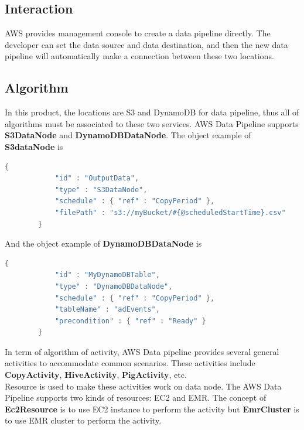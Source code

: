 	\subsection{Interaction}
	AWS provides management console to create a data pipeline directly. The developer can set the data source and data destination, and then the new data pipeline will automatically make  a connection between these two locations.  
    
	\subsection{Algorithm}
	In this product, the locations are S3 and DynamoDB for data pipeline, thus all of algorithms must be associated to these two services. AWS Data Pipeline supports \textbf{S3DataNode} and \textbf{DynamoDBDataNode}. The  object example of \textbf{S3dataNode} is

	\begin{lstlisting}[language=Java, caption=S3 Data Node example\cite{z6}]
        {
            "id" : "OutputData",
            "type" : "S3DataNode",
            "schedule" : { "ref" : "CopyPeriod" },
            "filePath" : "s3://myBucket/#{@scheduledStartTime}.csv"
        }
	\end{lstlisting}
	And the object example of \textbf{DynamoDBDataNode} is 
	\begin{lstlisting}[language=Java, caption=DynamoDB Data Node example\cite{z7}]
        {
            "id" : "MyDynamoDBTable",
            "type" : "DynamoDBDataNode",
            "schedule" : { "ref" : "CopyPeriod" },
            "tableName" : "adEvents",
            "precondition" : { "ref" : "Ready" }
        }
	\end{lstlisting}

	\noindent In term of algorithm of activity, AWS Data pipeline provides several general activities to accommodate common scenarios. These activities include \textbf{CopyActivity}, \textbf{HiveActivity}, \textbf{PigActivity}, etc.\\ 
    
    \noindent Resource is used to make these activities work on data node. The AWS Data Pipeline supports two kinds of resources: EC2 and EMR. The concept of \textbf{Ec2Resource} is to use EC2 instance to perform the activity but \textbf{EmrCluster} is to use EMR cluster to perform the activity. 


